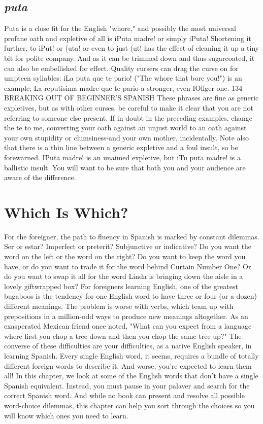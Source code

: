 \documentclass[14pt,a4paper,oneside]{memoir}
\begin{document}
\section{\emph{puta}}

Puta is a close fit for the English "whore," and possibly the
most universal profane oath and expletive of all is iPuta madre! or
simply iPuta! Shortening it further, to iPut! or (uta! or even to just
(ut! has the effect of cleaning it up a tiny bit for polite company. And
as it can be trimmed down and thus sugarcoated, it can also be embellished for effect. Quality cursers can drag the curse on for umpteen syllables: iLa puta que te pario! ("The whore that bore you!") is an example; La reputisima madre que te pario a stronger, even IOllger one.
134 BREAKING OUT OF BEGINNER'S SPANISH
These phrases are fine as generic expletives, but as with other
curses, be careful to make it clear that you are not referring to someone else present. If in doubt in the preceding examples, change the te
to me, converting your oath against an unjust world to an oath against
your own stupidity or clumsiness-and your own mother, incidentally.
Note also that there is a thin line between a generic expletive and a
foul insult, so be forewarned. IPuta madre! is an unaimed expletive,
but iTu puta madre! is a ballistic insult. You will want to be sure that
both you and your audience are aware of the difference.

\chapter{Which Is Which?}

For the foreigner, the path to fluency in Spanish is marked by
constant dilemmas. Ser or estar? Imperfect or preterit? Subjunctive
or indicative? Do you want the word on the left or the word on the
right? Do you want to keep the word you have, or do you want to trade
it for the word behind Curtain Number One? Or do you want to swap
it all for the word Linda is bringing down the aisle in a lovely giftwrapped box?
For foreigners learning English, one of the greatest bugaboos
is the tendency for one English word to have three or four (or a dozen)
different meanings. The problem is worse with verbs, which team up
with prepositions in a million-odd ways to produce new meanings altogether. As an exasperated Mexican friend once noted, "What can you
expect from a language where first you chop a tree down and then you
chop the same tree up?"
The converse of these difficulties are your difficulties, as a native English speaker, in learning Spanish. Every single English word, it
seems, requires a bundle of totally different foreign words to describe
it. And worse, you're expected to learn them all!
In this chapter, we look at some of the English words that
don't have a single Spanish equivalent. Instead, you must pause in your
palaver and search for the correct Spanish word. And while no book
can present and resolve all possible word-choice dilemmas, this chapter can help you sort through the choices so you will know which ones
you need to learn.
\end{document}
